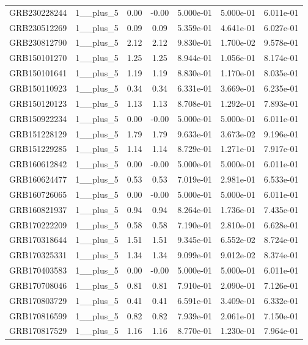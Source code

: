 \documentclass[12pt]{article}
\begin{document}
\begin{table}[h!]
{\begin{tabular}{l c c c c c c}
GRB230228244 & 1__plus_5 & 0.00 & -0.00 & 5.000e-01 & 5.000e-01 & 6.011e-01 \\
GRB230512269 & 1__plus_5 & 0.09 & 0.09 & 5.359e-01 & 4.641e-01 & 6.027e-01 \\
GRB230812790 & 1__plus_5 & 2.12 & 2.12 & 9.830e-01 & 1.700e-02 & 9.578e-01 \\
GRB150101270 & 1__plus_5 & 1.25 & 1.25 & 8.944e-01 & 1.056e-01 & 8.174e-01 \\
GRB150101641 & 1__plus_5 & 1.19 & 1.19 & 8.830e-01 & 1.170e-01 & 8.035e-01 \\
GRB150110923 & 1__plus_5 & 0.34 & 0.34 & 6.331e-01 & 3.669e-01 & 6.235e-01 \\
GRB150120123 & 1__plus_5 & 1.13 & 1.13 & 8.708e-01 & 1.292e-01 & 7.893e-01 \\
GRB150922234 & 1__plus_5 & 0.00 & -0.00 & 5.000e-01 & 5.000e-01 & 6.011e-01 \\
GRB151228129 & 1__plus_5 & 1.79 & 1.79 & 9.633e-01 & 3.673e-02 & 9.196e-01 \\
GRB151229285 & 1__plus_5 & 1.14 & 1.14 & 8.729e-01 & 1.271e-01 & 7.917e-01 \\
GRB160612842 & 1__plus_5 & 0.00 & -0.00 & 5.000e-01 & 5.000e-01 & 6.011e-01 \\
GRB160624477 & 1__plus_5 & 0.53 & 0.53 & 7.019e-01 & 2.981e-01 & 6.533e-01 \\
GRB160726065 & 1__plus_5 & 0.00 & -0.00 & 5.000e-01 & 5.000e-01 & 6.011e-01 \\
GRB160821937 & 1__plus_5 & 0.94 & 0.94 & 8.264e-01 & 1.736e-01 & 7.435e-01 \\
GRB170222209 & 1__plus_5 & 0.58 & 0.58 & 7.190e-01 & 2.810e-01 & 6.628e-01 \\
GRB170318644 & 1__plus_5 & 1.51 & 1.51 & 9.345e-01 & 6.552e-02 & 8.724e-01 \\
GRB170325331 & 1__plus_5 & 1.34 & 1.34 & 9.099e-01 & 9.012e-02 & 8.374e-01 \\
GRB170403583 & 1__plus_5 & 0.00 & -0.00 & 5.000e-01 & 5.000e-01 & 6.011e-01 \\
GRB170708046 & 1__plus_5 & 0.81 & 0.81 & 7.910e-01 & 2.090e-01 & 7.126e-01 \\
GRB170803729 & 1__plus_5 & 0.41 & 0.41 & 6.591e-01 & 3.409e-01 & 6.332e-01 \\
GRB170816599 & 1__plus_5 & 0.82 & 0.82 & 7.939e-01 & 2.061e-01 & 7.150e-01 \\
GRB170817529 & 1__plus_5 & 1.16 & 1.16 & 8.770e-01 & 1.230e-01 & 7.964e-01 \\

\end{tabular}}
\end{table}
\end{document}
